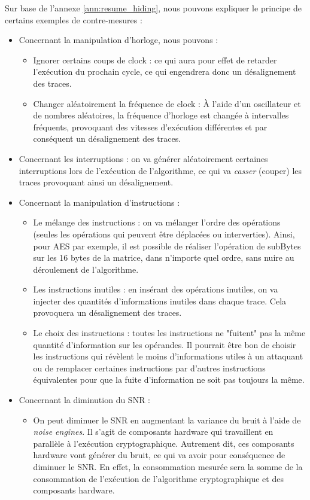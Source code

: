 \documentclass[oneside]{book}
\begin{document}
\hspace{-0.5 cm}Sur base de l'annexe \ref{ann:resume_hiding}, nous pouvons expliquer le principe de certains exemples de contre-mesures :
\begin{itemize}
\item Concernant la manipulation d’horloge, nous pouvons :
\begin{itemize}
\item Ignorer certains coups de clock : ce qui aura pour effet de retarder l’exécution du prochain cycle, ce qui engendrera donc un désalignement des traces.
\item Changer aléatoirement la fréquence de clock : À l’aide d’un oscillateur et de nombres aléatoires, la fréquence d’horloge est changée à intervalles fréquents, provoquant des vitesses d’exécution différentes et par conséquent un désalignement des traces.
\end{itemize}
\item Concernant les interruptions : on va générer aléatoirement certaines interruptions lors de l'exécution de l'algorithme, ce qui va \textit{casser} (couper) les traces provoquant ainsi un désalignement.
\item Concernant la manipulation d'instructions : 
\begin{itemize}
\item Le mélange des instructions : on va mélanger l’ordre des opérations (seules les opérations qui peuvent être déplacées ou interverties). Ainsi, pour AES par exemple, il est possible de réaliser l’opération de subBytes sur les 16 bytes de la matrice, dans n’importe quel ordre, sans nuire au déroulement de l’algorithme.
\item Les instructions inutiles : en insérant des opérations inutiles, on va injecter des quantités d'informations inutiles dans chaque trace. Cela provoquera un désalignement des traces.
\item Le choix des instructions : toutes les instructions ne "fuitent" pas la même quantité d’information sur les opérandes. Il pourrait être bon de choisir les instructions qui révèlent le moins d’informations utiles à un attaquant ou de remplacer certaines instructions par d’autres instructions équivalentes pour que la fuite d’information ne soit pas toujours la même.
\end{itemize}
\item Concernant la diminution du SNR :
\begin{itemize}
\item On peut diminuer le SNR en augmentant la variance du bruit à l'aide de \textit{noise engines}. Il s'agit de composants hardware qui travaillent en parallèle à l’exécution cryptographique. Autrement dit, ces composants hardware vont générer du bruit, ce qui va avoir pour conséquence de diminuer le SNR. En effet, la consommation mesurée sera la somme de la consommation de l’exécution de l’algorithme cryptographique et des composants hardware.

\end{itemize}
\end{itemize}
\end{document}
